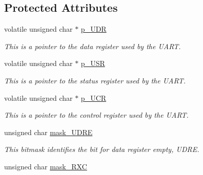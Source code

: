 \subsection*{Protected Attributes}
\begin{DoxyCompactItemize}
\item 
\hypertarget{classbase232_a25ab184b8ba64e6d50f29a261e3b53dd}{volatile unsigned char $\ast$ \hyperlink{classbase232_a25ab184b8ba64e6d50f29a261e3b53dd}{p\-\_\-\-U\-D\-R}}\label{classbase232_a25ab184b8ba64e6d50f29a261e3b53dd}

\begin{DoxyCompactList}\small\item\em This is a pointer to the data register used by the U\-A\-R\-T. \end{DoxyCompactList}\item 
\hypertarget{classbase232_a06c7bd5f9fdd7e894d1811f70582deb8}{volatile unsigned char $\ast$ \hyperlink{classbase232_a06c7bd5f9fdd7e894d1811f70582deb8}{p\-\_\-\-U\-S\-R}}\label{classbase232_a06c7bd5f9fdd7e894d1811f70582deb8}

\begin{DoxyCompactList}\small\item\em This is a pointer to the status register used by the U\-A\-R\-T. \end{DoxyCompactList}\item 
\hypertarget{classbase232_a69fc096531c8253b1fd47f05c04e3372}{volatile unsigned char $\ast$ \hyperlink{classbase232_a69fc096531c8253b1fd47f05c04e3372}{p\-\_\-\-U\-C\-R}}\label{classbase232_a69fc096531c8253b1fd47f05c04e3372}

\begin{DoxyCompactList}\small\item\em This is a pointer to the control register used by the U\-A\-R\-T. \end{DoxyCompactList}\item 
\hypertarget{classbase232_aeddba516d2a987d2cb71fe808845e8a4}{unsigned char \hyperlink{classbase232_aeddba516d2a987d2cb71fe808845e8a4}{mask\-\_\-\-U\-D\-R\-E}}\label{classbase232_aeddba516d2a987d2cb71fe808845e8a4}

\begin{DoxyCompactList}\small\item\em This bitmask identifies the bit for data register empty, U\-D\-R\-E. \end{DoxyCompactList}\item 
\hypertarget{classbase232_a0a32da6009456fd0db18ad8c1fadecc9}{unsigned char \hyperlink{classbase232_a0a32da6009456fd0db18ad8c1fadecc9}{mask\-\_\-\-R\-X\-C}}\label{classbase232_a0a32da6009456fd0db18ad8c1fadecc9}


\end{DoxyCompactItemize}
